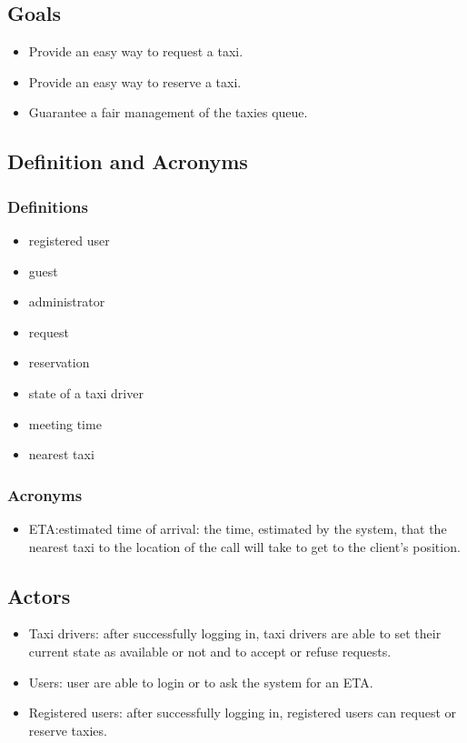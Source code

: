 \documentclass{article}
\begin{document}
\subsection{Goals}
\begin{itemize}
	\item Provide an easy way to request a taxi.
	\item Provide an easy way to reserve a taxi.
	\item Guarantee a fair management of the taxies queue.
\end{itemize}

\subsection{Definition and Acronyms}

\subsubsection{Definitions}
\begin{itemize}
	\item registered user
	\item guest
	\item administrator
	\item request
	\item reservation
	\item state of a taxi driver
	\item meeting time
	\item nearest taxi
\end{itemize}

\subsubsection{Acronyms}
\begin{itemize}
	\item ETA:\@ estimated time of arrival: the time, estimated by the system, that the nearest taxi to the location of the call will take to get to the client’s position.
\end{itemize}

\subsection{Actors}
\begin{itemize}
	\item Taxi drivers: after successfully logging in, taxi drivers are able to set their current state as available or not and to accept or refuse requests.
	\item Users: user are able to login or to ask the system for an ETA.\@
	\item Registered users: after successfully logging in, registered users can request or reserve taxies.
\end{itemize}
\end{document}

